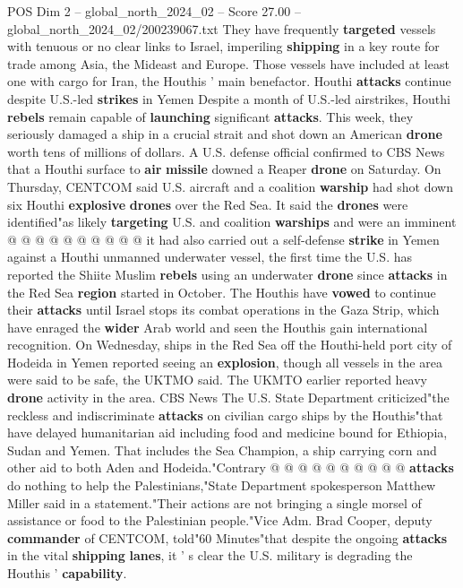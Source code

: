 \begin{textsample}{POS Dim 2 – global\_north\_2024\_02 – Score 27.00 – global\_north\_2024\_02/200239067.txt}
They have frequently \textbf{targeted} vessels with tenuous or no clear links to Israel, imperiling \textbf{shipping} in a key route for trade among Asia, the Mideast and Europe.
Those vessels have included at least one with cargo for Iran, the Houthis ' main benefactor.
Houthi \textbf{attacks} continue despite U.S.-led \textbf{strikes} in Yemen Despite a month of U.S.-led airstrikes, Houthi \textbf{rebels} remain capable of \textbf{launching} significant \textbf{attacks}.
This week, they seriously damaged a ship in a crucial strait and shot down an American \textbf{drone} worth tens of millions of dollars.
A U.S. defense official confirmed to CBS News that a Houthi surface to \textbf{air} \textbf{missile} downed a Reaper \textbf{drone} on Saturday.
On Thursday, CENTCOM said U.S. aircraft and a coalition \textbf{warship} had shot down six Houthi \textbf{explosive} \textbf{drones} over the Red Sea.
It said the \textbf{drones} were identified"as likely \textbf{targeting} U.S. and coalition \textbf{warships} and were an imminent @ @ @ @ @ @ @ @ @ @ it had also carried out a self-defense \textbf{strike} in Yemen against a Houthi unmanned underwater vessel, the first time the U.S. has reported the Shiite Muslim \textbf{rebels} using an underwater \textbf{drone} since \textbf{attacks} in the Red Sea \textbf{region} started in October.
The Houthis have \textbf{vowed} to continue their \textbf{attacks} until Israel stops its combat operations in the Gaza Strip, which have enraged the \textbf{wider} Arab world and seen the Houthis gain international recognition.
On Wednesday, ships in the Red Sea off the Houthi-held port city of Hodeida in Yemen reported seeing an \textbf{explosion}, though all vessels in the area were said to be safe, the UKTMO said.
The UKMTO earlier reported heavy \textbf{drone} activity in the area.
CBS News The U.S.
State Department criticized"the reckless and indiscriminate \textbf{attacks} on civilian cargo ships by the Houthis"that have delayed humanitarian aid including food and medicine bound for Ethiopia, Sudan and Yemen.
That includes the Sea Champion, a ship carrying corn and other aid to both Aden and Hodeida."Contrary @ @ @ @ @ @ @ @ @ @ \textbf{attacks} do nothing to help the Palestinians,"State Department spokesperson Matthew Miller said in a statement."Their actions are not bringing a single morsel of assistance or food to the Palestinian people."Vice Adm.
Brad Cooper, deputy \textbf{commander} of CENTCOM, told"60 Minutes"that despite the ongoing \textbf{attacks} in the vital \textbf{shipping} \textbf{lanes}, it ' s clear the U.S. military is degrading the Houthis ' \textbf{capability}.

\end{textsample}
